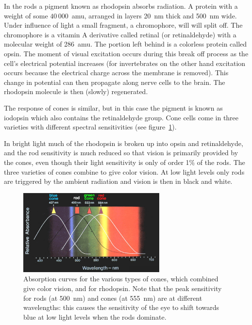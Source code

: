 In the rods a pigment known as rhodopsin absorbs radiation. A protein
with a weight of some $40\,000$~amu, arranged in layers 20~nm thick
and 500~nm wide. Under influence of light a small fragment, a
chromophore, will will split off. The chromophore is a vitamin A
derivative called retinal (or retinaldehyde) with a molecular weight
of 286~amu. The portion left behind is a colorless protein called opsin. 
The moment of visual excitation occurs during this break
off process as the cell's electrical potential increases (for
invertebrates on the other hand excitation occurs because the
electrical charge across the membrane is removed). This change in
potential can then propagate along nerve cells to the brain. The
rhodopsin molecule is then (slowly) regenerated. 

The response of cones is similar, but in this case the pigment is
known as iodopsin which also contains the retinaldehyde group. Cone
cells come in three varieties with different spectral sensitivities
(see figure~\ref{fig:absorption-rod-cone}).

In bright light much of the rhodopsin is broken up into opsin and
retinaldehyde, and the rod sensitivity is much reduced so that vision
is primarily provided by the cones, even though their light sensitivity
is only of order 1\% of the rods. The three varieties of cones combine
to give color vision. At low light levels only rods are triggered by
the ambient radiation and vision is then in black and white. 

\begin{figure}[h!]
\centering
\includegraphics[width=0.66\textwidth]{absorption-rod-cone.eps}
\caption{Absorption curves for the various types of cones, which combined
give color vision, and for rhodopsin. Note that the peak sensitivity
for rods (at 500~nm) and cones (at 555~nm) are at different wavelengths: this causes the
sensitivity of the eye to shift towards blue at low light levels when
the rods dominate.}
\label{fig:absorption-rod-cone}
\end{figure}


